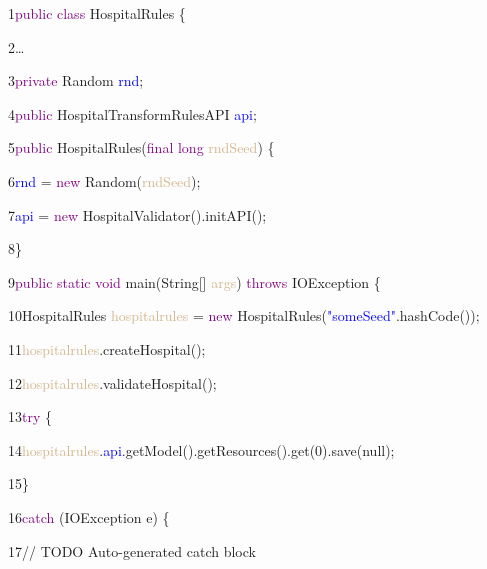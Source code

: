 {

1\hspace{0.5cm}\textcolor{Purple}{public class} HospitalRules \{

2\hspace{0.5cm}…	

3\hspace{1cm}\textcolor{Purple}{private} Random \textcolor{blue}{rnd};

4\hspace{1cm}\textcolor{Purple}{public} HospitalTransformRulesAPI \textcolor{blue}{api};

5\hspace{1cm}\textcolor{Purple}{public} HospitalRules(\textcolor{Purple}{final long} \textcolor{Tan}{rndSeed}) \{

6\hspace{1.5cm}\textcolor{blue}{rnd} = \textcolor{Purple}{new} Random(\textcolor{Tan}{rndSeed});

7\hspace{1.5cm}\textcolor{blue}{api} = \textcolor{Purple}{new} HospitalValidator().initAPI();

8\hspace{1cm}\}

9\hspace{1cm}\textcolor{Purple}{public static void} main(String[] \textcolor{Tan}{args}) \textcolor{Purple}{throws} IOException \{

10\hspace{1.5cm}HospitalRules \textcolor{Tan}{hospitalrules} = \textcolor{Purple}{new} HospitalRules(\textcolor{blue}{"someSeed"}.hashCode());

11\hspace{1.5cm}\textcolor{Tan}{hospitalrules}.createHospital();

12\hspace{1.5cm}\textcolor{Tan}{hospitalrules}.validateHospital();

13\hspace{1cm}\textcolor{Purple}{try} \{

14\hspace{1.5cm}\textcolor{Tan}{hospitalrules}.\textcolor{blue}{api}.getModel().getResources().get(0).save(null); 

15\hspace{1cm}\}

16\hspace{1cm}\textcolor{Purple}{catch} (IOException e) \{

17\hspace{1.5cm}// TODO Auto-generated catch block

}
